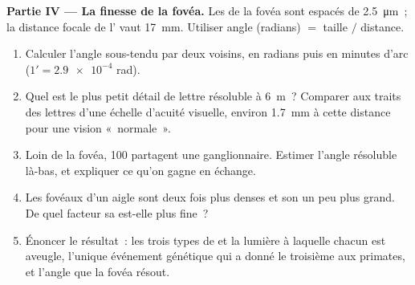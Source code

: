 \begin{problem}
\medskip
\noindent\textbf{Partie IV --- La finesse de la fovéa.}
Les  de la fovéa sont espacés de \qty{2.5}{\micro m}~; la distance
focale de l' vaut \qty{17}{mm}. Utiliser angle (radians) $=$ taille
$/$ distance.
\begin{enumerate}[resume]
  \item Calculer l'angle sous-tendu par deux  voisins, en radians
        puis en minutes d'arc ($1' = \num{2.9e-4}$ rad).
  \item Quel est le plus petit détail de lettre résoluble à
        \qty{6}{m}~? Comparer aux traits des lettres d'une échelle
        d'acuité visuelle, environ \qty{1.7}{mm} à cette distance pour
        une vision «~normale~».
  \item Loin de la fovéa, 100  partagent une 
        ganglionnaire. Estimer l'angle résoluble là-bas, et expliquer
        ce qu'on gagne en échange.
  \item Les  fovéaux d'un aigle sont deux fois plus denses et son
         un peu plus grand. De quel facteur sa  est-elle
        plus fine~?
  \item Énoncer le résultat~: les trois types de  et la lumière à
        laquelle chacun est aveugle, l'unique événement génétique qui a
        donné le troisième aux primates, et l'angle que la fovéa résout.
\end{enumerate}
\end{problem}
